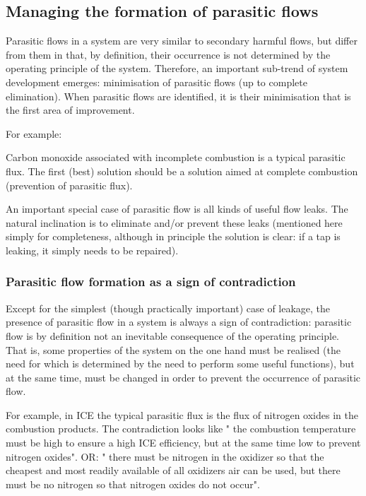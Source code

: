 \documentclass[a4paper,11pt]{article}
\begin{document}
\subsection{Managing the formation of parasitic flows}

Parasitic flows in a system are very similar to secondary harmful flows, but
differ from them in that, by definition, their occurrence is not determined by
the operating principle of the system. Therefore, an important sub-trend of
system development emerges: minimisation of parasitic flows (up to complete
elimination). When parasitic flows are identified, it is their minimisation
that is the first area of improvement.

For example:

Carbon monoxide associated with incomplete combustion is a typical parasitic
flux. The first (best) solution should be a solution aimed at complete
combustion (prevention of parasitic flux).

An important special case of parasitic flow is all kinds of useful flow
leaks. The natural inclination is to eliminate and/or prevent these leaks
(mentioned here simply for completeness, although in principle the solution is
clear: if a tap is leaking, it simply needs to be repaired).

\subsubsection{Parasitic flow formation as a sign of contradiction}

Except for the simplest (though practically important) case of leakage, the
presence of parasitic flow in a system is always a sign of contradiction:
parasitic flow is by definition not an inevitable consequence of the operating
principle. That is, some properties of the system on the one hand must be
realised (the need for which is determined by the need to perform some useful
functions), but at the same time, must be changed in order to prevent the
occurrence of parasitic flow.

For example, in ICE the typical parasitic flux is the flux of nitrogen oxides
in the combustion products. The contradiction looks like " the combustion
temperature must be high to ensure a high ICE efficiency, but at the same time
low to prevent nitrogen oxides". OR: " there must be nitrogen in the oxidizer
so that the cheapest and most readily available of all oxidizers air can be
used, but there must be no nitrogen so that nitrogen oxides do not occur".
\end{document}
